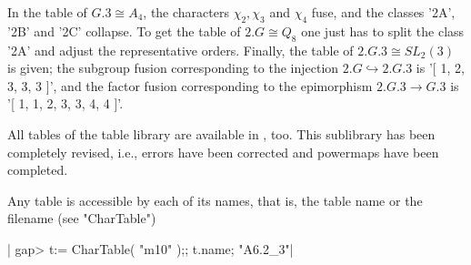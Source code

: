 %
%   
%   
%
%
%
%                                
%   

In the  table  of $G.3  \cong A_4$, the  characters  $\chi_2, \chi_3$ and
$\chi_4$ fuse, and the classes '2A', '2B'  and '2C' collapse.  To get the
table of $2.G \cong Q_8$ one just has to split  the class '2A' and adjust
the representative  orders.  Finally, the  table of $2.G.3 \cong SL_2(3)$
is    given; the subgroup   fusion  corresponding  to  the injection $2.G
\hookrightarrow  2.G.3$ is '[  1, 2,  3, 3,  3  ]', and the factor fusion
corresponding to  the epimorphism $2.G.3 \rightarrow G.3$  is '[ 1, 1, 2,
3, 3, 4, 4 ]'.

\newpage
{}%

All tables of the {\CAS} table library are  available in \GAP, too.  This
sublibrary has been completely revised, i.e.,  errors have been corrected
and powermaps have been completed.

Any {\CAS} table is accessible by each of  its {\CAS} names, that is, the
table name or the filename (see "CharTable")\:

|    gap> t:= CharTable( "m10" );; t.name;
    "A6.2_3"|

